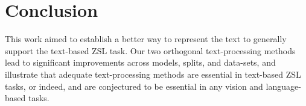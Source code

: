 \documentclass[11pt,a4paper]{article}
\newcommand\reut[1]{\textcolor{green}{\textbf{REUT:} #1 }}
\begin{document}
\par



\section{Conclusion}
\label{conclusion}

This work aimed to establish a better way to represent the text to generally support the text-based ZSL task. Our two orthogonal text-processing methods lead to significant improvements across models, splits, and data-sets, and illustrate that adequate text-processing methods are essential in text-based ZSL tasks, or indeed, and are conjectured to be essential in any vision and language-based tasks. 




\end{document}
